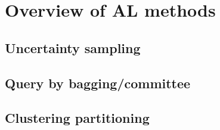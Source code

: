 \section{Overview of AL methods}
\label{sec:al:methods}

\subsection{Uncertainty sampling}

\subsection{Query by bagging/committee}

\subsection{Clustering partitioning}